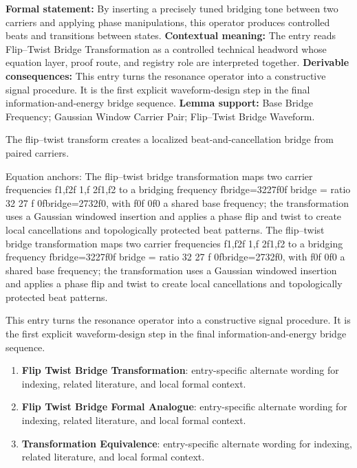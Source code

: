 \begingroup\footnotesize\setlength{\emergencystretch}{3em}\sloppy
\textbf{Formal statement:} By inserting a precisely tuned bridging tone between two carriers and applying phase manipulations, this operator produces controlled beats and transitions between states. \textbf{Contextual meaning:} The entry reads Flip--Twist Bridge Transformation as a controlled technical headword whose equation layer, proof route, and registry role are interpreted together. \textbf{Derivable consequences:} This entry turns the resonance operator into a constructive signal procedure. It is the first explicit waveform-design step in the final information-and-energy bridge sequence. \textbf{Lemma support:} Base Bridge Frequency; Gaussian Window Carrier Pair; Flip--Twist Bridge Waveform.\par
\endgroup

The flip--twist transform creates a localized beat-and-cancellation bridge from paired carriers.

Equation anchors: The flip--twist bridge transformation maps two carrier frequencies f1,f2f 1,f 2f1,f2 to a bridging frequency fbridge=3227f0f bridge = ratio 32 27 f 0fbridge=2732f0, with f0f 0f0 a shared base frequency; the transformation uses a Gaussian windowed insertion and applies a phase flip and twist to create local cancellations and topologically protected beat patterns. The flip--twist bridge transformation maps two carrier frequencies f1,f2f 1,f 2f1,f2 to a bridging frequency fbridge=3227f0f bridge = ratio 32 27 f 0fbridge=2732f0, with f0f 0f0 a shared base frequency; the transformation uses a Gaussian windowed insertion and applies a phase flip and twist to create local cancellations and topologically protected beat patterns.

This entry turns the resonance operator into a constructive signal procedure. It is the first explicit waveform-design step in the final information-and-energy bridge sequence.
\endgroup

\begingroup\footnotesize\sloppy
\begin{enumerate}[leftmargin=1.35em,itemsep=1pt,topsep=1pt,parsep=0pt]
\item \textbf{Flip Twist Bridge Transformation}: entry-specific alternate wording for indexing, related literature, and local formal context.
\item \textbf{Flip Twist Bridge Formal Analogue}: entry-specific alternate wording for indexing, related literature, and local formal context.
\item \textbf{Transformation Equivalence}: entry-specific alternate wording for indexing, related literature, and local formal context.
\end{enumerate}
\endgroup

